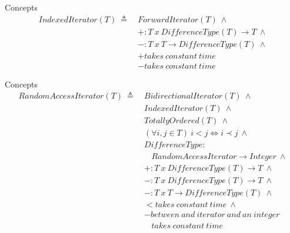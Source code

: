 \documentclass[10pt]{beamer}
\begin{document}
\begin{frame}{Concepts}
    \begin{align*}
        IndexedIterator(T) ~\triangleq~ & ForwardIterator(T) ~\land \\
                                              & +: T~x~DifferenceType(T) \rightarrow T ~\land\\
                                              & -: T~x~T \rightarrow DifferenceType(T) ~\land\\
                                              & + takes~constant~time\\
                                              & - takes~constant~time
    \end{align*}
\end{frame}


\begin{frame}{Concepts}
    \begin{align*}
        RandomAccessIterator(T)  ~\triangleq~ & BidirectionalIterator(T) ~\land \\
                                              & IndexedIterator(T) ~\land \\
                                              & TotallyOrdered(T) ~\land \\
                                              & (\forall i,j \in T) ~i < j \iff i \prec j ~ \land \\
                                              & DifferenceType: \\
                                              & ~~~~RandomAccessIterator \rightarrow Integer ~ \land\\
                                              & +: T~x~DifferenceType(T) \rightarrow T ~\land\\
                                              & -: T~x~DifferenceType(T) \rightarrow T ~\land\\
                                              & -: T~x~T \rightarrow DifferenceType(T) ~\land\\
                                              & < takes~constant~time ~\land\\
                                              & - between~and~iterator~and~an~integer \\
                                              & ~~~~takes~constant~time
    \end{align*}
\end{frame}
\end{document}
